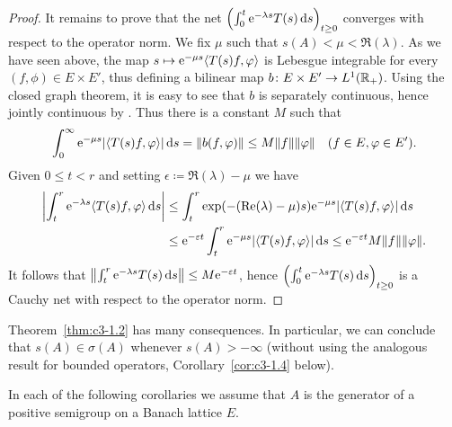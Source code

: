 \begin{proof}
It remains to prove that the net $\left(\int_{0}^t \eu^{-\lambda s}T(s) \ds \right)_{t\geq 0}$ converges with respect to the operator norm.
We fix $\mu$ such that $s(A) < \mu < \Re(\lambda)$.
As we have seen above, the map $s \mapsto \eu^{-\mu s}\langle T(s)f,\phi\rangle$ is Lebesgue integrable for every $(f,\phi) \in E \times E'$, thus defining a bilinear map $b \colon E \times E' \to L^1(\mathbb{R} _{+})$.
Using the closed graph theorem, it is easy to see that $b$ is separately continuous, hence jointly continuous by \textcite[III.Theorem~5.1]{schaefer:1966}.
Thus there is a constant $M$ such that
\begin{equation}\label{eq:c3-1.4}
	\int_{0}^{\infty} \eu^{-\mu s}|\langle T(s)f,\phi\rangle| \ds  = \|b(f,\phi)\| \leq M\|f\|\|\phi\| \quad (f \in E, \phi \in E') .
\end{equation}
Given $0 \leq t < r$ and setting $\epsilon \coloneq \Re(\lambda) - \mu$ we have
\begin{align*}
	\left|\int_{t}^r \eu^{-\lambda s}\langle T(s)f,\phi\rangle \ds \right| &\leq \int_{t}^r \exp(-(\Re(\lambda)-\mu)s)\eu^{-\mu s}|\langle T(s)f,\phi\rangle| \ds  \\
	&\leq \eu^{-\epsilon t}\int_{t}^r \eu^{-\mu s}|\langle T(s)f,\phi\rangle| \ds  \leq \eu^{-\epsilon t} M\|f\|\|\phi\|.
\end{align*}
It follows that $\left\|\int_{t}^r \eu^{-\lambda s}T(s) \ds \right\| \leq M\eu^{-\epsilon t}$, hence $\left(\int_{0}^t \eu^{-\lambda s}T(s) \ds \right)_{t\geq 0}$ is a Cauchy net with respect to the operator norm.
\end{proof}
Theorem~\ref{thm:c3-1.2} has many consequences.
In particular, we can conclude that $s(A) \in \sigma(A)$ whenever $s(A) > -\infty$ (without using the analogous result for bounded operators, \cf Corollary~\ref{cor:c3-1.4} below).

In each of the following corollaries we assume that $A$ is the generator of a positive semigroup on a Banach lattice $E$.

